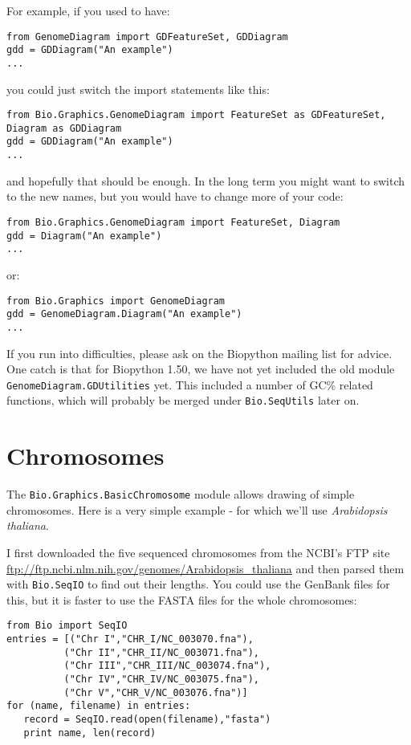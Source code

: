\documentclass{report}
\begin{document}
For example, if you used to have:
\begin{verbatim}
from GenomeDiagram import GDFeatureSet, GDDiagram
gdd = GDDiagram("An example")
...
\end{verbatim}
you could just switch the import statements like this:
\begin{verbatim}
from Bio.Graphics.GenomeDiagram import FeatureSet as GDFeatureSet, Diagram as GDDiagram
gdd = GDDiagram("An example")
...
\end{verbatim}
and hopefully that should be enough.  In the long term you might want to
switch to the new names, but you would have to change more of your code:
\begin{verbatim}
from Bio.Graphics.GenomeDiagram import FeatureSet, Diagram
gdd = Diagram("An example")
...
\end{verbatim}
or:
\begin{verbatim}
from Bio.Graphics import GenomeDiagram
gdd = GenomeDiagram.Diagram("An example")
...
\end{verbatim}

If you run into difficulties, please ask on the Biopython mailing list for
advice. One catch is that for Biopython 1.50, we have not yet included the
old module \verb|GenomeDiagram.GDUtilities| yet.  This included a number of
GC\% related functions, which will probably be merged under
\verb|Bio.SeqUtils| later on.

\section{Chromosomes}

The \verb|Bio.Graphics.BasicChromosome| module allows drawing of simple chromosomes.
Here is a very simple example - for which we'll use \textit{Arabidopsis thaliana}.

I first downloaded the five sequenced chromosomes from the NCBI's FTP site
\url{ftp://ftp.ncbi.nlm.nih.gov/genomes/Arabidopsis_thaliana} and then parsed
them with \verb|Bio.SeqIO| to find out their lengths.  You could use the
GenBank files for this, but it is faster to use the FASTA files for the
whole chromosomes:

\begin{verbatim}
from Bio import SeqIO
entries = [("Chr I","CHR_I/NC_003070.fna"),
          ("Chr II","CHR_II/NC_003071.fna"),
          ("Chr III","CHR_III/NC_003074.fna"),
          ("Chr IV","CHR_IV/NC_003075.fna"),
          ("Chr V","CHR_V/NC_003076.fna")]
for (name, filename) in entries:
   record = SeqIO.read(open(filename),"fasta")
   print name, len(record)
\end{verbatim}
\end{document}
